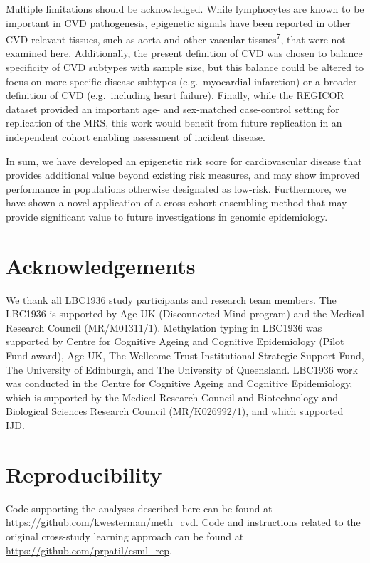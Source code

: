 \documentclass[]{article}
\begin{document}
Multiple limitations should be acknowledged. While lymphocytes are known
to be important in CVD pathogenesis, epigenetic signals have been
reported in other CVD-relevant tissues, such as aorta and other vascular
tissues\textsuperscript{7}, that were not examined here. Additionally,
the present definition of CVD was chosen to balance specificity of CVD
subtypes with sample size, but this balance could be altered to focus on
more specific disease subtypes (e.g.~myocardial infarction) or a broader
definition of CVD (e.g.~including heart failure). Finally, while the
REGICOR dataset provided an important age- and sex-matched case-control
setting for replication of the MRS, this work would benefit from future
replication in an independent cohort enabling assessment of incident
disease.

In sum, we have developed an epigenetic risk score for cardiovascular
disease that provides additional value beyond existing risk measures,
and may show improved performance in populations otherwise designated as
low-risk. Furthermore, we have shown a novel application of a
cross-cohort ensembling method that may provide significant value to
future investigations in genomic epidemiology.

\hypertarget{acknowledgements}{%
\section{Acknowledgements}\label{acknowledgements}}

We thank all LBC1936 study participants and research team members. The
LBC1936 is supported by Age UK (Disconnected Mind program) and the
Medical Research Council (MR/M01311/1). Methylation typing in LBC1936
was supported by Centre for Cognitive Ageing and Cognitive Epidemiology
(Pilot Fund award), Age UK, The Wellcome Trust Institutional Strategic
Support Fund, The University of Edinburgh, and The University of
Queensland. LBC1936 work was conducted in the Centre for Cognitive
Ageing and Cognitive Epidemiology, which is supported by the Medical
Research Council and Biotechnology and Biological Sciences Research
Council (MR/K026992/1), and which supported IJD.

\hypertarget{reproducibility}{%
\section{Reproducibility}\label{reproducibility}}

Code supporting the analyses described here can be found at
\url{https://github.com/kwesterman/meth_cvd}. Code and instructions
related to the original cross-study learning approach can be found at
\url{https://github.com/prpatil/csml_rep}.
\end{document}
